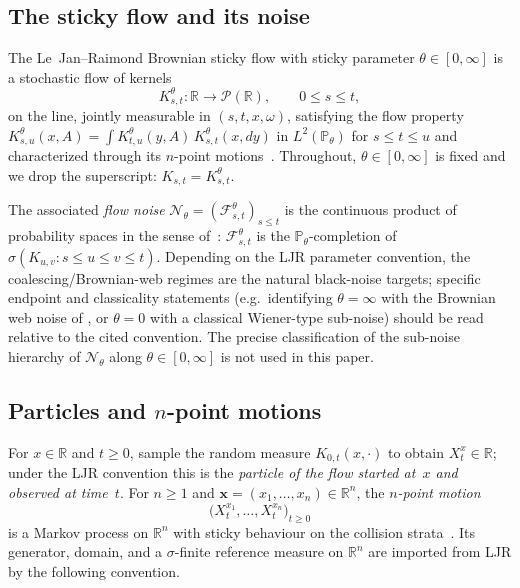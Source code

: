 \documentclass[11pt,reqno]{amsart}
\theoremstyle{plain}
\theoremstyle{definition}
\theoremstyle{remark}
\newcommand{\R}{\mathbb R}
\newcommand{\Prob}{\mathbb P}
\newcommand{\cF}{\mathcal F}
\newcommand{\cN}{\mathcal N}
\newcommand{\cP}{\mathcal P}
\newcommand{\Pth}{\Prob_{\theta}}
\begin{document}
\subsection{The sticky flow and its noise}\label{sec:LJR-flow}

The Le~Jan--Raimond Brownian sticky flow with sticky parameter
$\theta\in[0,\infty]$ is a stochastic flow of kernels
\begin{equation}\label{eq:LJR-kernel}
  K^{\theta}_{s,t}\colon\R\to\cP(\R),\qquad 0\le s\le t,
\end{equation}
on the line, jointly measurable in $(s,t,x,\omega)$, satisfying the
flow property
$K^{\theta}_{s,u}(x,A)=\int K^{\theta}_{t,u}(y,A)\,K^{\theta}_{s,t}(x,dy)$
in $L^{2}(\Pth)$ for $s\le t\le u$ and characterized through its
$n$-point motions~\cite[Thm.~3.2 and \S 4]{LeJanRaimond2004}.
Throughout, $\theta\in[0,\infty]$ is fixed and we drop the
superscript: $K_{s,t}=K^{\theta}_{s,t}$.

The associated \emph{flow noise} $\cN_{\theta}=(\cF^{\theta}_{s,t})_{s\le t}$
is the continuous product of probability spaces in the sense
of~\cite[\S 6]{LeJanRaimond2004,Tsirelson2004}: $\cF^{\theta}_{s,t}$
is the $\Pth$-completion of $\sigma(K_{u,v}:s\le u\le v\le t)$.
Depending on the LJR parameter convention, the
coalescing/Brownian-web regimes are the natural black-noise targets;
specific endpoint and classicality statements
(e.g.\ identifying $\theta=\infty$ with the Brownian web noise of
\cite{Tsirelson2004,SchertzerSunSwart}, or $\theta=0$ with a
classical Wiener-type sub-noise) should be read relative to the
cited convention. The precise classification of the sub-noise
hierarchy of $\cN_{\theta}$ along $\theta\in[0,\infty]$ is not used
in this paper.

\subsection{Particles and \texorpdfstring{$n$}{n}-point motions}\label{sec:LJR-npoint}

For $x\in\R$ and $t\ge 0$, sample the random measure $K_{0,t}(x,\cdot)$
to obtain $X^{x}_{t}\in\R$; under the LJR convention this is the
\emph{particle of the flow started at~$x$ and observed at time~$t$}.
For $n\ge 1$ and $\mathbf x=(x_{1},\ldots,x_{n})\in\R^{n}$, the
\emph{$n$-point motion}
\begin{equation}\label{eq:n-point-motion}
  \bigl(X^{x_{1}}_{t},\ldots,X^{x_{n}}_{t}\bigr)_{t\ge 0}
\end{equation}
is a Markov process on $\R^{n}$ with sticky behaviour on the
collision strata~\cite[\S 3]{LeJanRaimond2004}. Its generator,
domain, and a $\sigma$-finite reference measure on $\R^{n}$ are
imported from LJR by the following convention.
\end{document}

